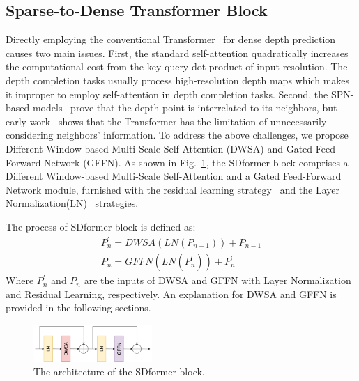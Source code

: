 \documentclass[conference]{IEEEtran}
\begin{document}
\subsection{Sparse-to-Dense Transformer Block}
Directly employing the conventional Transformer~\cite{b3} for dense depth prediction causes two main issues. First, the standard self-attention quadratically increases the computational cost from the key-query dot-product of input resolution. The depth completion tasks usually process high-resolution depth maps which makes it improper to employ self-attention in depth completion tasks. 
Second, the SPN-based models~\cite{b17,b18,b19} prove that the depth point is interrelated to its neighbors, but early work~\cite{b23,b24} shows that the Transformer has the limitation of unnecessarily considering neighbors' information.  
To address the above challenges, we propose Different Window-based Multi-Scale Self-Attention (DWSA) and Gated Feed-Forward Network (GFFN).
As shown in Fig.~\ref{fig:block}, the SDformer block comprises a Different Window-based Multi-Scale Self-Attention and a Gated Feed-Forward Network module, furnished with the residual learning strategy~\cite{b25} and the Layer Normalization(LN)~\cite{b26} strategies.

The process of SDformer block is defined as:
\begin{equation}
\begin{array}{l}
P_{n}^{\prime} = DWSA\left(LN\left(P_{n-1}\right)\right)+P_{n-1}\\
P_{n}=GFFN\left(LN\left(P_{n}^{\prime}\right)\right)+P_{n}^{\prime}
\end{array}
\end{equation}
Where $P_{n}^{\prime}$ and $P_{n}$ are the inputs of DWSA and GFFN with Layer Normalization and Residual Learning, respectively. 
An explanation for DWSA and GFFN is provided in the following sections. 

\begin{figure}[htbp]
\centerline{\includegraphics[width=0.4\textwidth] {block}}
\caption{The architecture of the SDformer block.}
\label{fig:block}
\end{figure}
\end{document}
